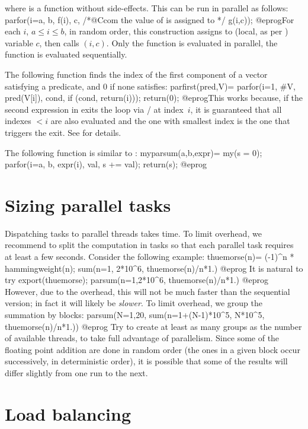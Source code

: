 where  is a function without side-effects.  This can be run in parallel
as follows:
\bprog
parfor(i=a, b,
  f(i),
  c,     /*@Ccom the value of  is assigned to  */
  g(i,c));
@eprog\noindent For each $i$, $a \leq i \leq b$, in random order,
this construction assigns  to (local, as per ) variable
$c$, then calls $(i,c)$. Only the function  is evaluated
in parallel, the function  is evaluated sequentially.

The following function finds the index of the first component of a vector
satisfying a predicate, and $0$ if none satisfies:
\bprog
parfirst(pred,V)=
{
  parfor(i=1, #V,
    pred(V[i]),
    cond,
    if (cond, return(i)));
  return(0);
}
@eprog\noindent This works because, if the second expression
in  exits the loop via  /  at index~$i$,
it is guaranteed that all indexes $< i$ are also evaluated and the one with
smallest index is the one that triggers the exit. See  for
details.

The following function is similar to :
\bprog
myparsum(a,b,expr)=
{
  my(s = 0);
  parfor(i=a, b,
    expr(i),
    val,
    s += val);
  return(s);
}
@eprog

\section{Sizing parallel tasks}

Dispatching tasks to parallel threads takes time. To limit overhead, we
recommend to split the computation in tasks so that each parallel task
requires at least a few seconds. Consider the following example:
\bprog
  thuemorse(n)= (-1)^n * hammingweight(n);
  sum(n=1, 2*10^6, thuemorse(n)/n*1.)
@eprog\noindent
It is natural to try
\bprog
  export(thuemorse);
  parsum(n=1,2*10^6, thuemorse(n)/n*1.)
@eprog\noindent
However, due to the overhead, this will not be much faster than the
sequential version; in fact it will likely be \emph{slower}. To limit overhead,
we group the summation by blocks:
\bprog
  parsum(N=1,20, sum(n=1+(N-1)*10^5, N*10^5, thuemorse(n)/n*1.))
@eprog\noindent
Try to create at least as many groups as the number of available threads,
to take full advantage of parallelism. Since some of the floating point
addition are done in random order (the ones in a given block occur
successively, in deterministic order), it is possible that some of the
results will differ slightly from one run to the next.

\section{Load balancing}

